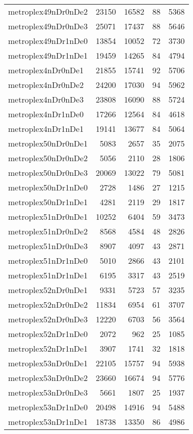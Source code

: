 \begin{tabular}{lrrrr}
metroplex49nDr0nDe2 & 23150 & 16582 & 88 & 5368 \\
metroplex49nDr0nDe3 & 25071 & 17437 & 88 & 5646 \\
metroplex49nDr1nDe0 & 13854 & 10052 & 72 & 3730 \\
metroplex49nDr1nDe1 & 19459 & 14265 & 84 & 4794 \\
metroplex4nDr0nDe1 & 21855 & 15741 & 92 & 5706 \\
metroplex4nDr0nDe2 & 24200 & 17030 & 94 & 5962 \\
metroplex4nDr0nDe3 & 23808 & 16090 & 88 & 5724 \\
metroplex4nDr1nDe0 & 17266 & 12564 & 84 & 4618 \\
metroplex4nDr1nDe1 & 19141 & 13677 & 84 & 5064 \\
metroplex50nDr0nDe1 & 5083 & 2657 & 35 & 2075 \\
metroplex50nDr0nDe2 & 5056 & 2110 & 28 & 1806 \\
metroplex50nDr0nDe3 & 20069 & 13022 & 79 & 5081 \\
metroplex50nDr1nDe0 & 2728 & 1486 & 27 & 1215 \\
metroplex50nDr1nDe1 & 4281 & 2119 & 29 & 1817 \\
metroplex51nDr0nDe1 & 10252 & 6404 & 59 & 3473 \\
metroplex51nDr0nDe2 & 8568 & 4584 & 48 & 2826 \\
metroplex51nDr0nDe3 & 8907 & 4097 & 43 & 2871 \\
metroplex51nDr1nDe0 & 5010 & 2866 & 43 & 2101 \\
metroplex51nDr1nDe1 & 6195 & 3317 & 43 & 2519 \\
metroplex52nDr0nDe1 & 9331 & 5723 & 57 & 3235 \\
metroplex52nDr0nDe2 & 11834 & 6954 & 61 & 3707 \\
metroplex52nDr0nDe3 & 12220 & 6703 & 56 & 3564 \\
metroplex52nDr1nDe0 & 2072 & 962 & 25 & 1085 \\
metroplex52nDr1nDe1 & 3907 & 1741 & 32 & 1818 \\
metroplex53nDr0nDe1 & 22105 & 15757 & 94 & 5938 \\
metroplex53nDr0nDe2 & 23660 & 16674 & 94 & 5776 \\
metroplex53nDr0nDe3 & 5661 & 1807 & 25 & 1937 \\
metroplex53nDr1nDe0 & 20498 & 14916 & 94 & 5488 \\
metroplex53nDr1nDe1 & 18738 & 13350 & 86 & 4986 \\

\end{tabular}
